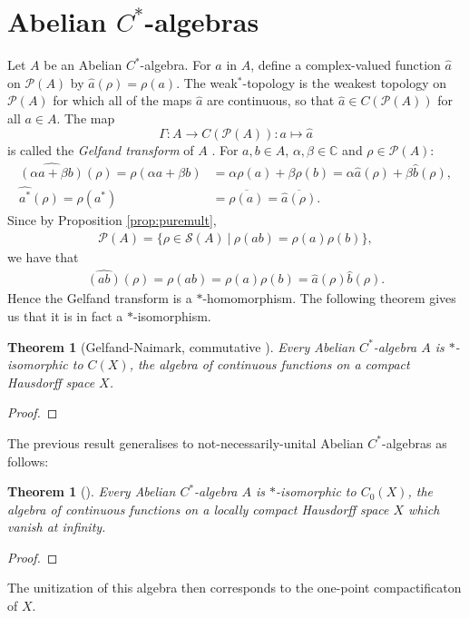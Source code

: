\documentclass[12pt,a4paper]{report}
\theoremstyle{plain}
\newtheorem{thm}{Theorem}
\newtheorem*{thm*}{Theorem}
\theoremstyle{definition}
\newcommand{\1}{\mathbbm{1}}
\newcommand{\C}{\mathbb{C}}
\newcommand{\CX}{C(X)}
\renewcommand{\S}{\mathscr{S}}
\renewcommand{\P}[1]{\mathscr{P}(#1)}
\begin{document}
\section{Abelian $C^\ast$-algebras}\label{section:abelian}


Let $A$ be an Abelian $C^\ast$-algebra. For $a$ in $A$, define a complex-valued function $\hat{a}$ on
$\P{A}$ by $\hat{a}(\rho)= \rho(a)$. The weak$^\ast$-topology is the weakest topology on 
$\P{A}$ for which all of the maps $\hat{a}$ are continuous, so that $\hat{a} \in C(\P{A})$ for all 
$a\in A$. The map
\[
	\Gamma:A \to C(\P{A}) : a\mapsto \hat{a}
\]
is called the \emph{Gelfand transform} of $A$ \cite{davidson96}.
For $a,b \in A$, $\alpha,\beta\in\C$ and $\rho\in\P{A}$:
\begin{align*}
	\widehat{(\alpha a+\beta b)}(\rho) = \rho(\alpha a+\beta b) 
	&=	\alpha\rho(a) +\beta\rho(b) = \alpha\hat{a}(\rho)+ \beta\hat{b}(\rho), 	\\
	\widehat{a^\ast}(\rho) = \rho(a^\ast) &= \overline{\rho(a)} = \overline{\hat{a}(\rho)}.
\end{align*}
Since by Proposition \ref{prop:puremult},
\begin{align*}
	\P{A} = \{\rho \in \S(A) ~|~ \rho(ab) = \rho(a)\rho(b)\},
\end{align*}
we have that 
\begin{align*}
	\widehat{(ab)} (\rho)= \rho(ab) = \rho(a)\rho(b) = \hat{a}(\rho)\hat{b}(\rho).
\end{align*}
Hence the Gelfand transform is a $\ast$-homomorphism. The following theorem gives us that it is
in fact a $\ast$-isomorphism.

\begin{thm}[{Gelfand-Naimark, commutative \cite[4.4.3]{kadison83}}] 
	Every Abelian $C^\ast$-algebra $A$ is $\ast$-isomorphic to $\CX$, the algebra of continuous
	functions on a compact Hausdorff space $X$.
\end{thm}
\begin{proof}
	
	
\end{proof}%


The previous result generalises to not-necessarily-unital Abelian $C^\ast$-algebras as follows:
\begin{thm*}[{\cite[I.2.7]{davidson96}}]
	Every Abelian $C^\ast$-algebra $A$ is $\ast$-isomorphic to $C_0(X)$, the algebra of 
	continuous functions on a locally compact Hausdorff space $X$ which vanish at infinity.
\end{thm*}
\begin{proof}
\end{proof}
The unitization of this algebra then corresponds to the one-point compactificaton of $X$.
	
\end{document}
